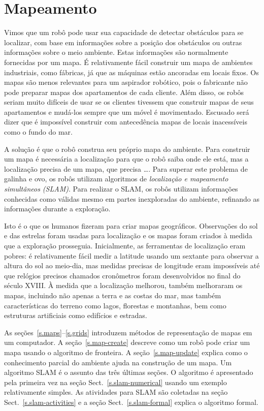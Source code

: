 
\chapter{Mapeamento}\label{ch.mapping}

Vimos que um robô pode usar sua capacidade de detectar obstáculos para se localizar, com base em informações sobre a posição dos obstáculos ou outras informações sobre o meio ambiente. Estas informações são normalmente fornecidas por um mapa. É relativamente fácil construir um mapa de ambientes industriais, como fábricas, já que as máquinas estão ancoradas em locais fixos. Os mapas são menos relevantes para um aspirador robótico, pois o fabricante não pode preparar mapas dos apartamentos de cada cliente. Além disso, os robôs seriam muito difíceis de usar se os clientes tivessem que construir mapas de seus apartamentos e mudá-los sempre que um móvel é movimentado. Escusado será dizer que é impossível construir com antecedência mapas de locais inacessíveis como o fundo do mar.

A solução é que o robô construa seu próprio mapa do ambiente. Para construir um mapa é necessária a localização para que o robô saiba onde ele está, mas a localização precisa de um mapa, que precisa \ldots. Para superar este problema de galinha e ovo, os robôs utilizam algoritmos de \emph{localização e mapeamento simultâneos (SLAM)}. Para realizar o SLAM, os robôs utilizam informações conhecidas como válidas mesmo em partes inexploradas do ambiente, refinando as informações durante a exploração.

Isto é o que os humanos fizeram para criar mapas geográficos. Observações do sol e das estrelas foram usadas para localização e os mapas foram criados à medida que a exploração prosseguia. Inicialmente, as ferramentas de localização eram pobres: é relativamente fácil medir a latitude usando um sextante para observar a altura do sol ao meio-dia, mas medidas precisas de longitude eram impossíveis até que relógios precisos chamados cronômetros foram desenvolvidos no final do século XVIII. À medida que a localização melhorou, também melhoraram os mapas, incluindo não apenas a terra e as costas do mar, mas também características do terreno como lagos, florestas e montanhas, bem como estruturas artificiais como edifícios e estradas.

As seções~\ref{s.maps}--\ref{s.grids} introduzem métodos de representação de mapas em um computador. A seção~\ref{s.map-create} descreve como um robô pode criar um mapa usando o algoritmo de fronteira. A seção~\ref{s.map-update} explica como o conhecimento parcial do ambiente ajuda na construção de um mapa. Um algoritmo SLAM é o assunto das três últimas seções.  O algoritmo é apresentado pela primeira vez na seção Sect.~\ref{s.slam-numerical} usando um exemplo relativamente simples. As atividades para SLAM são coletadas na seção Sect.~\ref{s.slam-activities} e a seção Sect.~\ref{s.slam-formal} explica o algoritmo formal.


